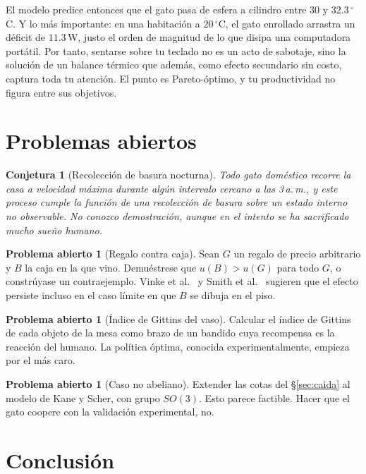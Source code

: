 \documentclass[11pt,a4paper]{article}
\theoremstyle{plain}
\newtheorem{conjetura}[teorema]{Conjetura}
\theoremstyle{definition}
\newtheorem{problema}[teorema]{Problema abierto}
\theoremstyle{remark}
\numberwithin{equation}{section}
\begin{document}
El modelo predice entonces que el gato pasa de esfera a cilindro entre $30$ y $32.3\,^\circ$C. Y lo más importante: en una habitación a $20\,^\circ$C, el gato enrollado arrastra un déficit de $11.3$\,W, justo el orden de magnitud de lo que disipa una computadora portátil. Por tanto, sentarse sobre tu teclado no es un acto de sabotaje, sino la solución de un balance térmico que además, como efecto secundario sin costo, captura toda tu atención. El punto es Pareto-óptimo, y tu productividad no figura entre sus objetivos.

\section{Problemas abiertos}\label{sec:abiertos}

\begin{conjetura}[Recolección de basura nocturna]
Todo gato doméstico recorre la casa a velocidad máxima durante algún intervalo cercano a las 3\,a.\,m., y este proceso cumple la función de una recolección de basura sobre un estado interno no observable. No conozco demostración, aunque en el intento se ha sacrificado mucho sueño humano.
\end{conjetura}

\begin{problema}[Regalo contra caja]
Sean $G$ un regalo de precio arbitrario y $B$ la caja en la que vino. Demuéstrese que $u(B)>u(G)$ para todo $G$, o constrúyase un contraejemplo. Vinke et al.~\cite{vinke} y Smith et al.~\cite{smith} sugieren que el efecto persiste incluso en el caso límite en que $B$ se dibuja en el piso.
\end{problema}

\begin{problema}[Índice de Gittins del vaso]
Calcular el índice de Gittins de cada objeto de la mesa como brazo de un bandido cuya recompensa es la reacción del humano. La política óptima, conocida experimentalmente, empieza por el más caro.
\end{problema}

\begin{problema}[Caso no abeliano]
Extender las cotas del \S\ref{sec:caida} al modelo de Kane y Scher, con grupo $SO(3)$. Esto parece factible. Hacer que el gato coopere con la validación experimental, no.
\end{problema}

\section{Conclusión}
\end{document}
